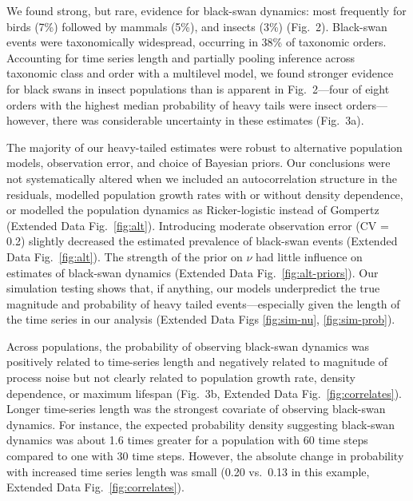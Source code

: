 We found strong, but rare, evidence for black-swan dynamics: most frequently for birds (7\%) followed by mammals (5\%), and insects (3\%) (Fig.~2). Black-swan events were taxonomically widespread, occurring in 38\% of taxonomic orders. Accounting for time series length and partially pooling inference across taxonomic class and order with a multilevel model, we found stronger evidence for black swans in insect populations than is apparent in Fig.~2---four of eight orders with the highest median probability of heavy tails were insect orders---however, there was considerable uncertainty in these estimates (Fig.~3a).

The majority of our heavy-tailed estimates were robust to alternative population models, observation error, and choice of Bayesian priors. Our conclusions were not systematically altered when we included an autocorrelation structure in the residuals, modelled population growth rates with or without density dependence, or modelled the population dynamics as Ricker-logistic instead of Gompertz (Extended Data Fig.~\ref{fig:alt}). Introducing moderate observation error (CV = 0.2) slightly decreased the estimated prevalence of black-swan events (Extended Data Fig.~\ref{fig:alt}). The strength of the prior on \(\nu\) had little influence on estimates of black-swan dynamics (Extended Data Fig.~\ref{fig:alt-priors}). Our simulation testing shows that, if anything, our models underpredict the true magnitude and probability of heavy tailed events---especially given the length of the time series in our analysis (Extended Data Figs \ref{fig:sim-nu}, \ref{fig:sim-prob}).

Across populations, the probability of observing black-swan dynamics was positively related to time-series length and negatively related to magnitude of process noise but not clearly related to population growth rate, density dependence, or maximum lifespan (Fig.~3b, Extended Data Fig.~\ref{fig:correlates}). Longer time-series length was the strongest covariate of observing black-swan dynamics. For instance, the expected probability density suggesting black-swan dynamics was about 1.6 times greater for a population with 60 time steps compared to one with 30 time steps. However, the absolute change in probability with increased time series length was small (0.20 vs.~0.13 in this example, Extended Data Fig.~\ref{fig:correlates}).

